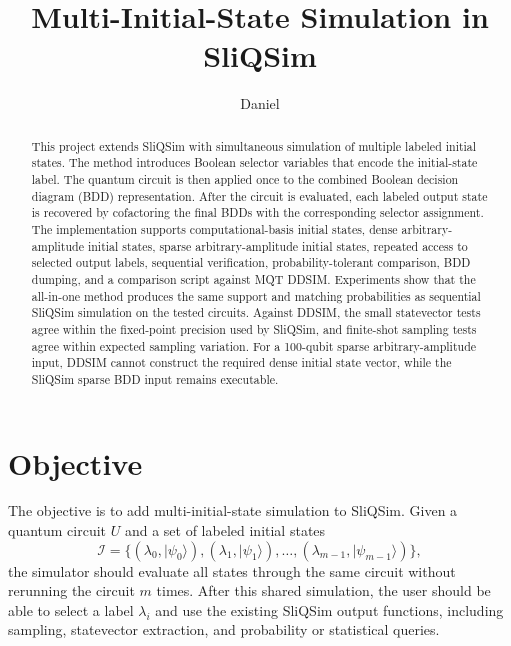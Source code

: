 \documentclass[sigconf,nonacm]{acmart}
\title{Multi-Initial-State Simulation in SliQSim}
\author{Daniel}
\affiliation{
  \institution{Final Project Report}
  \city{Taipei}
  \country{Taiwan}
}
\begin{document}
\sloppy

\begin{abstract}
This project extends SliQSim with simultaneous simulation of multiple labeled initial states. The method introduces Boolean selector variables that encode the initial-state label. The quantum circuit is then applied once to the combined Boolean decision diagram (BDD) representation. After the circuit is evaluated, each labeled output state is recovered by cofactoring the final BDDs with the corresponding selector assignment. The implementation supports computational-basis initial states, dense arbitrary-amplitude initial states, sparse arbitrary-amplitude initial states, repeated access to selected output labels, sequential verification, probability-tolerant comparison, BDD dumping, and a comparison script against MQT DDSIM. Experiments show that the all-in-one method produces the same support and matching probabilities as sequential SliQSim simulation on the tested circuits. Against DDSIM, the small statevector tests agree within the fixed-point precision used by SliQSim, and finite-shot sampling tests agree within expected sampling variation. For a 100-qubit sparse arbitrary-amplitude input, DDSIM cannot construct the required dense initial state vector, while the SliQSim sparse BDD input remains executable.
\end{abstract}

\maketitle

\section{Objective}
The objective is to add multi-initial-state simulation to SliQSim. Given a quantum circuit $U$ and a set of labeled initial states
\[
  \mathcal{I}=\{(\lambda_0,\lvert\psi_0\rangle),(\lambda_1,\lvert\psi_1\rangle),\ldots,(\lambda_{m-1},\lvert\psi_{m-1}\rangle)\},
\]
the simulator should evaluate all states through the same circuit without rerunning the circuit $m$ times. After this shared simulation, the user should be able to select a label $\lambda_i$ and use the existing SliQSim output functions, including sampling, statevector extraction, and probability or statistical queries.
\end{document}

